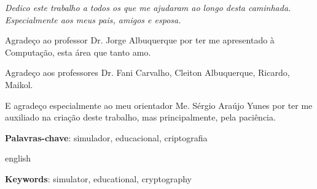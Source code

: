 \documentclass[
	12pt,				%
	openany,			%
	oneside,			%
	a4paper,			%
	english,			%
	brazil				%
	]{{Modelo/abntex2_FBUNI}}
\begin{document}


\frenchspacing 


\imprimircapa
\imprimirfolhaderosto*

%
%
\cleardoublepage

\begin{dedicatoria}
   \vspace*{\fill}
   \centering
   \noindent
   \textit{
    Dedico este trabalho a todos os que me ajudaram ao longo desta caminhada. Especialmente aos meus pais, amigos e esposa.
   }
   \vspace*{\fill}
\end{dedicatoria}

\begin{agradecimentos}
    Agradeço ao professor Dr. Jorge Albuquerque por ter me apresentado à Computação, esta área que tanto amo.
    
    Agradeço aos professores Dr. Fani Carvalho, Cleiton Albuquerque, Ricardo, Maikol.
    
    E agradeço especialmente ao meu orientador Me. Sérgio Araújo Yunes por ter me auxiliado na criação deste trabalho, mas principalmente, pela paciência.
    
\end{agradecimentos}

\begin{resumo}
    
    \vspace{\onelineskip}
    \noindent 
    \textbf{Palavras-chave}: simulador, educacional, criptografia
\end{resumo}
\cleardoublepage
\begin{resumo}[Abstract]
    \begin{otherlanguage*}{english}
    
    \vspace{\onelineskip}
    \noindent 
    \textbf{Keywords}: simulator, educational, cryptography
    \end{otherlanguage*}
\end{resumo}
\end{document}
